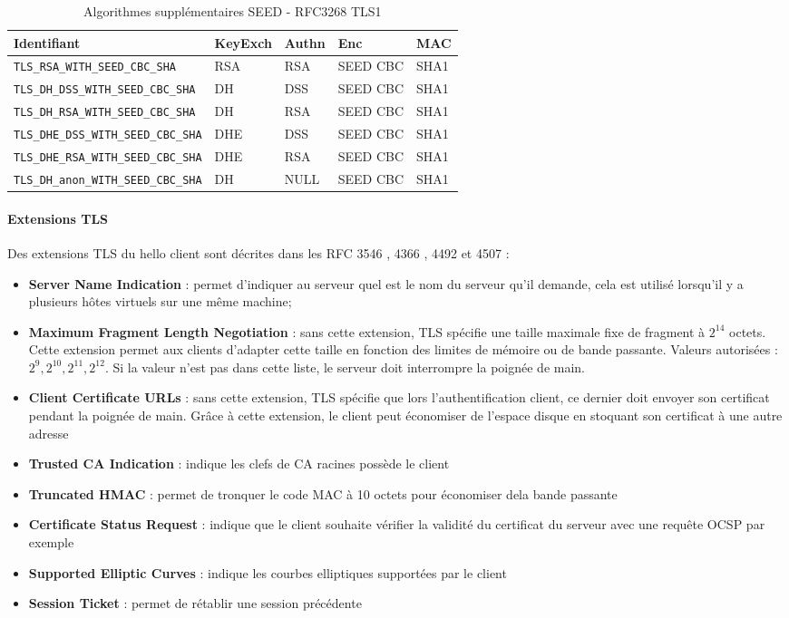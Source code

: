 \begin{table}[H]
\centering
\begin{tabularx}{17cm}{|l|l|l|X|l|}
\hline
\textbf{Identifiant} & \textbf{KeyExch} & \textbf{Authn}& \textbf{Enc}& \textbf{MAC}\\
\hline
\verb+TLS_RSA_WITH_SEED_CBC_SHA+&RSA&RSA&SEED CBC&SHA1\\
\hline
\verb+TLS_DH_DSS_WITH_SEED_CBC_SHA+&DH&DSS&SEED CBC&SHA1\\
\hline 
\verb+TLS_DH_RSA_WITH_SEED_CBC_SHA+&DH&RSA&SEED CBC&SHA1\\
\hline 
\verb+TLS_DHE_DSS_WITH_SEED_CBC_SHA+&DHE&DSS&SEED CBC&SHA1\\
\hline
\verb+TLS_DHE_RSA_WITH_SEED_CBC_SHA+&DHE&RSA&SEED CBC&SHA1\\
\hline
\verb+TLS_DH_anon_WITH_SEED_CBC_SHA+ &DH&NULL&SEED CBC&SHA1\\
\hline
\end{tabularx}
\caption{Algorithmes supplémentaires SEED - RFC3268 TLS1}
\label{algosTLSRFCSEED}
\end{table}


\paragraph{Extensions TLS}
Des extensions TLS du hello client sont décrites dans les RFC 3546 \cite{rfc3546}, 4366 \cite{rfc4366}, 4492 \cite{rfc4492} et 4507 \cite{rfc4507}:
\begin{itemize}
\item \textbf{Server Name Indication} : permet d'indiquer au serveur quel est le nom du serveur qu'il demande, cela est utilisé lorsqu'il y a plusieurs hôtes virtuels sur une même machine;
\item \textbf{Maximum Fragment Length Negotiation} : sans cette extension, TLS spécifie une taille maximale fixe de fragment à $2^{14}$ octets. Cette extension permet aux clients d'adapter cette taille en fonction des limites de mémoire ou de bande passante. Valeurs autorisées : $2^9, 2^{10}, 2^{11}, 2^{12}$. Si la valeur n'est pas dans cette liste, le serveur doit interrompre la poignée de main.
\item \textbf{Client Certificate URLs} : sans cette extension, TLS spécifie que lors l'authentification client, ce dernier doit envoyer son certificat pendant la poignée de main. Grâce à cette extension, le client peut économiser de l'espace disque en stoquant son certificat à une autre adresse
\item \textbf{Trusted CA Indication} : indique les clefs de CA racines possède le client
\item \textbf{Truncated HMAC} : permet de tronquer le code MAC à 10 octets pour économiser dela bande passante
\item \textbf{Certificate Status Request} : indique que le client souhaite vérifier la validité du certificat du serveur avec une requête OCSP par exemple
\item \textbf{Supported Elliptic Curves} : indique les courbes elliptiques supportées par le client
\item \textbf{Session Ticket} : permet de rétablir une session précédente
\end{itemize}

